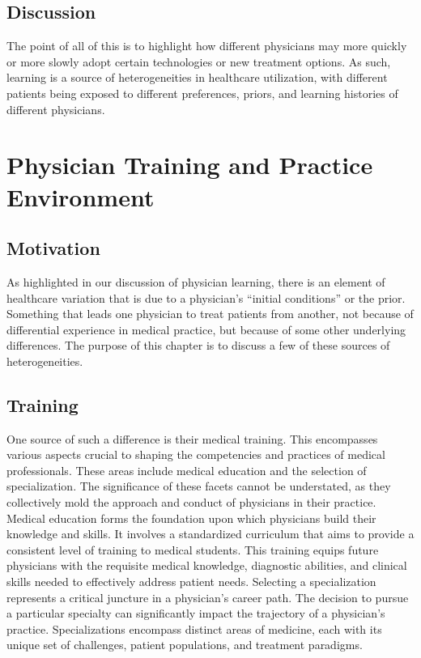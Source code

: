 \documentclass[
  letterpaper,
  DIV=11,
  numbers=noendperiod]{scrreport}
\theoremstyle{definition}
\theoremstyle{remark}
\begin{document}
\hypertarget{discussion}{%
\section{Discussion}\label{discussion}}

The point of all of this is to highlight how different physicians may
more quickly or more slowly adopt certain technologies or new treatment
options. As such, learning is a source of heterogeneities in healthcare
utilization, with different patients being exposed to different
preferences, priors, and learning histories of different physicians.

\hypertarget{physician-training-and-practice-environment}{%
\chapter{Physician Training and Practice
Environment}\label{physician-training-and-practice-environment}}

\hypertarget{motivation-1}{%
\section{Motivation}\label{motivation-1}}

As highlighted in our discussion of physician learning, there is an
element of healthcare variation that is due to a physician's ``initial
conditions'' or the prior. Something that leads one physician to treat
patients from another, not because of differential experience in medical
practice, but because of some other underlying differences. The purpose
of this chapter is to discuss a few of these sources of heterogeneities.

\hypertarget{training}{%
\section{Training}\label{training}}

One source of such a difference is their medical training. This
encompasses various aspects crucial to shaping the competencies and
practices of medical professionals. These areas include medical
education and the selection of specialization. The significance of these
facets cannot be understated, as they collectively mold the approach and
conduct of physicians in their practice. Medical education forms the
foundation upon which physicians build their knowledge and skills. It
involves a standardized curriculum that aims to provide a consistent
level of training to medical students. This training equips future
physicians with the requisite medical knowledge, diagnostic abilities,
and clinical skills needed to effectively address patient needs.
Selecting a specialization represents a critical juncture in a
physician's career path. The decision to pursue a particular specialty
can significantly impact the trajectory of a physician's practice.
Specializations encompass distinct areas of medicine, each with its
unique set of challenges, patient populations, and treatment paradigms.
\end{document}
